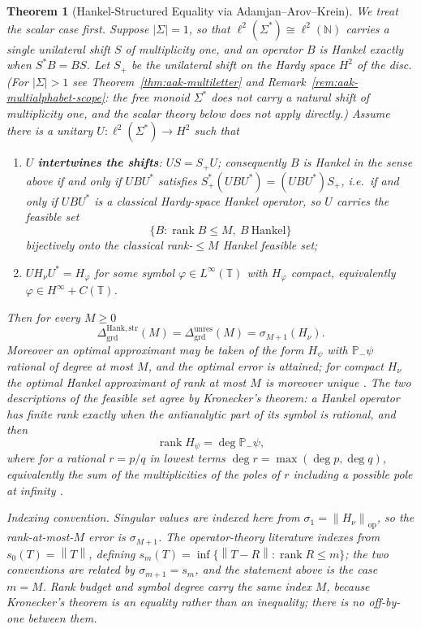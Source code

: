 \documentclass[12pt]{article}
\newtheorem{theorem}{Theorem}[section]
\theoremstyle{definition}
\DeclareMathOperator{\rank}{rank}
\newcommand{\norm}[1]{\left\lVert#1\right\rVert}
\newcommand{\Dunres}{\Delta_{\mathrm{grd}}^{\mathrm{unres}}}
\newcommand{\DHankstr}{\Delta_{\mathrm{grd}}^{\mathrm{Hank,str}}}
\begin{document}
\begin{theorem}[Hankel-Structured Equality via Adamjan--Arov--Krein]
\label{thm:aak-equality}
We treat the scalar case first.  Suppose $|\Sigma|=1$, so that
$\ell^2(\Sigma^*)\cong\ell^2(\mathbb N)$ carries a single unilateral shift $S$
of multiplicity one, and an operator $B$ is Hankel exactly when $S^{*}B=BS$.
Let $S_+$ be the unilateral shift on the Hardy space $H^2$ of the disc.  (For
$|\Sigma|>1$ see Theorem~\ref{thm:aak-multiletter} and
Remark~\ref{rem:aak-multialphabet-scope}: the free monoid $\Sigma^*$ does
\emph{not} carry a natural shift of multiplicity one, and the scalar theory
below does not apply directly.)  Assume there is a unitary
$U:\ell^2(\Sigma^*)\to H^2$ such that
\begin{enumerate}[label=(\alph*)]
\item $U$ \textbf{intertwines the shifts}: $US=S_+U$; consequently $B$ is
Hankel in the sense above if and only if $UBU^{*}$ satisfies
$S_+^{*}(UBU^{*})=(UBU^{*})S_+$, i.e.\ if and only if $UBU^{*}$ is a
classical Hardy-space Hankel operator, so $U$ carries the feasible set
\[
\{B:\operatorname{rank}B\le M,\ B\ \text{Hankel}\}
\]
\emph{bijectively} onto the classical rank-$\le M$ Hankel feasible set;
\item $UH_\nu U^{*}=H_\varphi$ for some symbol
$\varphi\in L^\infty(\mathbb T)$ with $H_\varphi$ compact, equivalently
$\varphi\in H^\infty+C(\mathbb T)$.
\end{enumerate}
Then for every $M\ge0$
\[
\DHankstr(M)
=
\Dunres(M)
=
\sigma_{M+1}(H_\nu).
\]
Moreover an optimal approximant may be taken of the form $H_\psi$ with
$\mathbb P_-\psi$ rational of degree at most $M$, and the optimal error is
attained; for compact $H_\nu$ the optimal Hankel approximant of rank at most
$M$ is moreover unique \cite{aak1971}.  The two descriptions of the feasible
set agree by Kronecker's theorem: a Hankel operator has finite rank exactly
when the antianalytic part of its symbol is rational, and then
\[
\rank H_\psi=\deg\mathbb P_-\psi ,
\]
where for a rational $r=p/q$ in lowest terms $\deg r=\max(\deg p,\deg q)$,
equivalently the sum of the multiplicities of the poles of $r$ including a
possible pole at infinity \cite[Sec.~4]{peller2003}.

\emph{Indexing convention.}  Singular values are indexed here from
$\sigma_1=\norm{H_\nu}_{\mathrm{op}}$, so the rank-at-most-$M$ error is
$\sigma_{M+1}$.  The operator-theory literature indexes from
$s_0(T)=\norm{T}$, defining $s_m(T)=\inf\{\norm{T-R}:\rank R\le m\}$; the two
conventions are related by $\sigma_{m+1}=s_m$, and the statement above is the
case $m=M$.  Rank budget and symbol degree carry the \emph{same} index $M$,
because Kronecker's theorem is an equality rather than an inequality; there is
no off-by-one between them.
\end{theorem}
\end{document}
